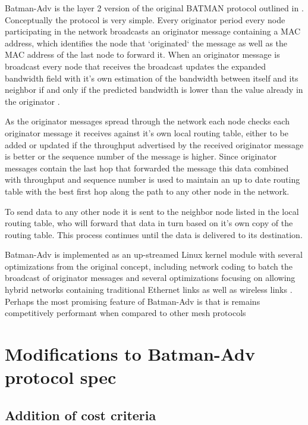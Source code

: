 \documentclass[11pt]{article}
\begin{document}
    Batman-Adv is the layer 2 version of the original BATMAN protocol outlined in \cite{batman}. Conceptually the protocol is very simple. Every originator period every node participating in the network broadcasts an originator message containing a MAC address, which identifies the node that `originated` the message as well as the MAC address of the last node to forward it.  When an originator message is broadcast every node that receives the broadcast updates the expanded bandwidth field with it's own estimation of the bandwidth between itself and its neighbor if and only if the predicted bandwidth is lower than the value already in the originator \cite{batroam}.
    
    As the originator messages spread through the network each node checks each originator message it receives against it's own local routing table, either to be added or updated if the throughput advertised by the received originator message is better or the sequence number of the message is higher. Since originator messages contain the last hop that forwarded the message this data combined with throughput and sequence number is used to maintain an up to date routing table with the best first hop along the path to any other node in the network.
    
    To send data to any other node it is sent to the neighbor node listed in the local routing table, who will forward that data in turn based on it's own copy of the routing table. This process continues until the data is delivered to its destination.
    
    Batman-Adv is implemented as an up-streamed Linux kernel module with several optimizations from the original concept, including network coding to batch the broadcast of originator messages and several optimizations focusing on allowing hybrid networks containing traditional Ethernet links as well as wireless links \cite{catwoman}. Perhaps the most promising feature of Batman-Adv is that is remains competitively performant when compared to other mesh protocols \cite{meshperf}


\section{Modifications to Batman-Adv protocol spec}

	\subsection{Addition of cost criteria} \label{cost}
\end{document}
